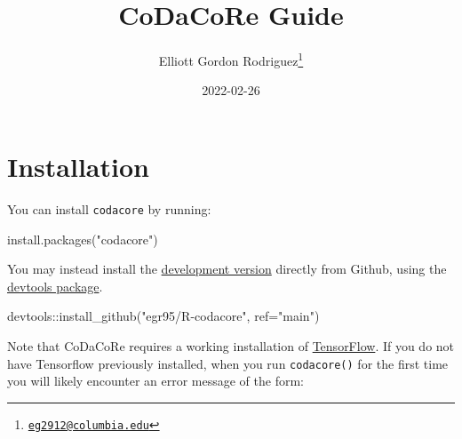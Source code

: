 \documentclass[
]{article}
\title{CoDaCoRe Guide}
\author{Elliott Gordon Rodriguez\footnote{\href{mailto:eg2912@columbia.edu}{\nolinkurl{eg2912@columbia.edu}}}}
\date{2022-02-26}
\newenvironment{Shaded}{\begin{snugshade}}{\end{snugshade}}
\newcommand{\AttributeTok}[1]{\textcolor[rgb]{0.77,0.63,0.00}{#1}}
\newcommand{\FunctionTok}[1]{\textcolor[rgb]{0.00,0.00,0.00}{#1}}
\newcommand{\NormalTok}[1]{#1}
\newcommand{\SpecialCharTok}[1]{\textcolor[rgb]{0.00,0.00,0.00}{#1}}
\newcommand{\StringTok}[1]{\textcolor[rgb]{0.31,0.60,0.02}{#1}}
\begin{document}
\maketitle

\hypertarget{installation}{%
\section{Installation}\label{installation}}

You can install \texttt{codacore} by running:

\begin{Shaded}
\begin{Highlighting}[]
\FunctionTok{install.packages}\NormalTok{(}\StringTok{"codacore"}\NormalTok{)}
\end{Highlighting}
\end{Shaded}

You may instead install the
\href{https://github.com/egr95/R-codacore}{development version} directly
from Github, using the
\href{https://www.r-project.org/nosvn/pandoc/devtools.html}{devtools
package}.

\begin{Shaded}
\begin{Highlighting}[]
\NormalTok{devtools}\SpecialCharTok{::}\FunctionTok{install\_github}\NormalTok{(}\StringTok{"egr95/R{-}codacore"}\NormalTok{, }\AttributeTok{ref=}\StringTok{"main"}\NormalTok{)}
\end{Highlighting}
\end{Shaded}

Note that CoDaCoRe requires a working installation of
\href{https://tensorflow.rstudio.com/}{TensorFlow}. If you do not have
Tensorflow previously installed, when you run \texttt{codacore()} for
the first time you will likely encounter an error message of the form:
\end{document}
